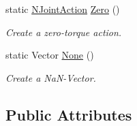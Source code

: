 \begin{DoxyCompactItemize}
static \hyperlink{structrobot__interfaces_1_1NJointAction}{N\+Joint\+Action} \hyperlink{structrobot__interfaces_1_1NJointAction_a7def88d6d46acd3e77db3dc49d04dd88}{Zero} ()
\begin{DoxyCompactList}\small\item\em Create a zero-\/torque action. \end{DoxyCompactList}\item 
static Vector \hyperlink{structrobot__interfaces_1_1NJointAction_abb5403bb946dc4b9e9e5e13b9195ad86}{None} ()
\begin{DoxyCompactList}\small\item\em Create a Na\+N-\/\+Vector. \end{DoxyCompactList}\end{DoxyCompactItemize}
\subsection*{Public Attributes}
